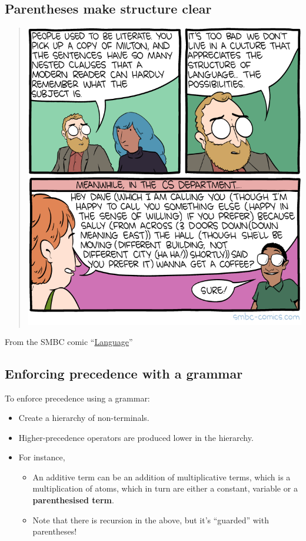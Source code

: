 \documentclass[11pt]{article}
\theoremstyle{definition}
\begin{document}
\subsection{Parentheses make structure clear}
\label{sec:org7e601aa}
\begin{quote}
\begin{center}
\includegraphics[width=\textwidth]{./media/comics/language.png}
\end{center}
\end{quote}
From the SMBC comic “\href{http://smbc-comics.com/comic/language}{Language}”

\subsection{Enforcing precedence with a grammar}
\label{sec:orgdb936c6}
To enforce precedence using a grammar:
\begin{itemize}
\item Create a hierarchy of non-terminals.
\item Higher-precedence operators are produced lower in the hierarchy.
\item For instance,
\begin{itemize}
\item An additive term can be an addition of multiplicative terms,
which is a multiplication of atoms, which in turn are
either a constant, variable or a \textbf{parenthesised term}.
\item Note that there is recursion in the above,
but it's “guarded” with parentheses!
\end{itemize}
\end{itemize}
\end{document}
